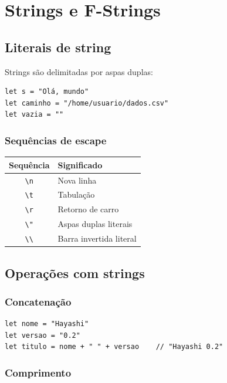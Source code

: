 \chapter{Strings e F-Strings}

\section{Literais de string}

Strings são delimitadas por aspas duplas:

\begin{lstlisting}
let s = "Olá, mundo"
let caminho = "/home/usuario/dados.csv"
let vazia = ""
\end{lstlisting}

\subsection*{Sequências de escape}

\begin{center}
\begin{tabular}{cl}
\toprule
\textbf{Sequência} & \textbf{Significado} \\
\midrule
\texttt{\textbackslash n}  & Nova linha \\
\texttt{\textbackslash t}  & Tabulação \\
\texttt{\textbackslash r}  & Retorno de carro \\
\texttt{\textbackslash"}   & Aspas duplas literais \\
\texttt{\textbackslash\textbackslash} & Barra invertida literal \\
\bottomrule
\end{tabular}
\end{center}

\section{Operações com strings}

\subsection*{Concatenação}

\begin{lstlisting}
let nome = "Hayashi"
let versao = "0.2"
let titulo = nome + " " + versao    // "Hayashi 0.2"
\end{lstlisting}

\subsection*{Comprimento}


